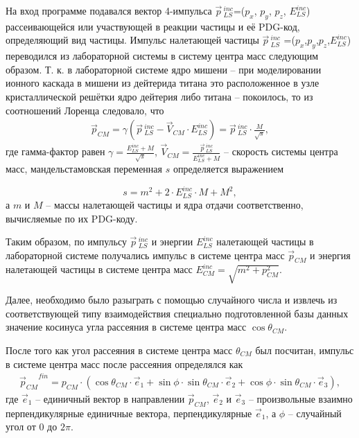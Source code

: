 \documentclass[a4paper,12pt]{article}
\begin{document}
\begin{large}
	На вход программе подавался вектор 4-импульса $\vec{p}\,^{inc}_{LS}$=($p_x$, $p_y$, $p_z$, $E^{inc}_{LS}$) рассеивающейся или участвующей в реакции частицы и её PDG-код, определяющий вид частицы.
	Импульс налетающей частицы $\vec{p}\,_{LS}^{inc}$ =($p_x$,$p_y$,$p_z$,$E^{inc}_{LS}$) переводился из лабораторной системы в систему центра масс следующим образом.
	Т. к. в лабораторной системе ядро мишени -- при моделировании ионного каскада в мишени из дейтерида титана это расположенное в узле кристаллической решётки ядро дейтерия либо титана -- покоилось, то из соотношений Лоренца следовало, что
\begin{equation}
\label{PLStoCM}
\begin{aligned} 
  \vec{p}_{CM} = \gamma \left( \vec{p}\,_{LS}^{inc} - \vec{V}_{CM} \cdot E_{LS}^{inc} \right) = \vec{p}\,_{LS}^{inc} \cdot \frac{M}{\sqrt{s}},
\end{aligned}
\end{equation}
где гамма-фактор равен $\gamma=\frac{E_{LS}^{inc}+M}{\sqrt{s}}$, $\vec{V}_{CM} = \frac{\vec{p}\,_{LS}^{inc}}{E_{LS}^{inc}+M}$ -- скорость системы центра масс, мандельстамовская переменная $s$ определяется выражением

\begin{equation}
  \label{MandelStahmSVariableDefinition}    
  s=m^2+2 \cdot E^{inc}_{LS} \cdot M + M^2,
\end{equation}
	а $m$ и $M$ -- массы налетающей частицы и ядра отдачи соответственно, вычисляемые по их PDG-коду. 

	Таким образом, по импульсу $\vec{p}\,_{LS}^{inc}$ и энергии $E_{LS}^{inc}$ налетающей частицы в лабораторной системе получались импульс в системе центра масс $\vec{p}_{CM}$ и энергия налетающей частицы в системе центра масс $E^{inc}_{CM}=\sqrt{m^2+p_{CM}^2}$.
	
	Далее, необходимо было разыграть с помощью случайного числа и извлечь из соответствующей типу взаимодействия специально подготовленной базы данных значение косинуса угла рассеяния в системе центра масс $\cos{\theta_{CM}}$.
	
	После того как угол рассеяния в системе центра масс $\theta_{CM}$ был посчитан, импульс в системе центра масс после рассеяния определялся как
\begin{equation}
\label{CMMomentumFin}
\begin{aligned} 
  {\vec{p}_{CM}}^{fin} = p_{CM}\cdot\left(\cos{\theta_{CM}} \cdot \vec{e}_1 + \sin{\phi} \cdot   \sin{\theta_{CM}} \cdot \vec{e}_2 +  \cos{\phi} \cdot \sin{\theta_{CM}} \cdot \vec{e}_3\right),
\end{aligned}
\end{equation}
где $\vec{e}_1$ -- единичный вектор в направлении $\vec{p}_{CM}$, $\vec{e}_2$ и $\vec{e}_3$ -- произвольные взаимно перпендикулярные единичные вектора, перпендикулярные $\vec{e}_1$, а $\phi$ -- случайный угол от $0$ до $2\pi$.
	

\end{large}
\end{document}
